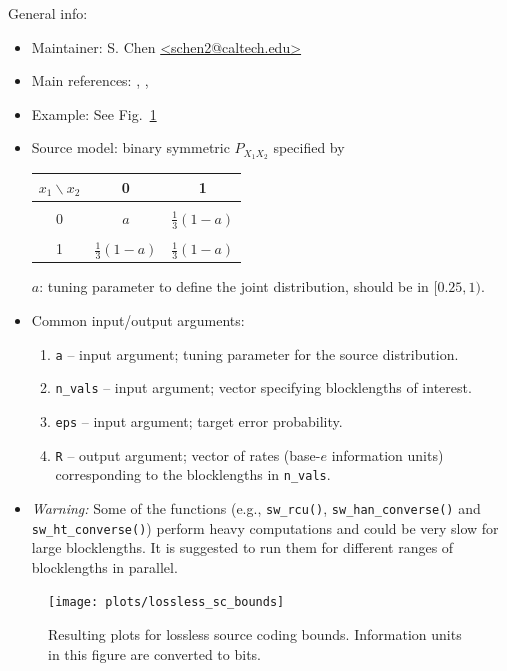 \documentclass[a4paper,11p]{memoir}
\begin{document}
General info:
\begin{itemize}
	\item Maintainer: S. Chen \url{<schen2@caltech.edu>}
	
	\item Main references: \cite{CEK19}, \cite{HAN03}, \cite{kostina2011fixed}
	
	\item Example: See Fig.~\ref{fig:lossless_sc_bounds} 
	
	\item Source model: binary symmetric $P_{X_1X_2}$ specified by
	\begin{center}
		\begin{tabular}[center]{ c | c  c }			
		$x_1 \backslash x_2$ & 0 & 1 \\
		\hline
		& & \\
		0 & $a$ & $\frac{1}{3}(1-a)$ \\ 
		& & \\
		1 & $\frac{1}{3}(1-a)$ & $\frac{1}{3}(1-a)$ \\
		\end{tabular}
	\end{center}
	$a$: tuning parameter to define the joint distribution, should be in $[0.25, 1)$.

	\item Common input/output arguments:
	\begin{enumerate}
		\item \verb|a| -- input argument; tuning parameter for the source distribution.
		\item \verb|n_vals| -- input argument; vector specifying blocklengths of interest.
		\item \verb|eps| -- input argument; target error probability.
		\item \verb|R| -- output argument; vector of rates (base-$e$ information units) corresponding to the blocklengths in \verb|n_vals|. 
	\end{enumerate}
	\item \textit{Warning:} Some of the functions (e.g., \verb|sw_rcu()|, \verb|sw_han_converse()| and \verb|sw_ht_converse()|) perform heavy computations and could be very slow for large blocklengths. It is suggested to run them for different ranges of blocklengths in parallel. 
\end{itemize}

\begin{figure}
\centering
\texttt{[image: plots/lossless\_sc\_bounds]}
\caption{Resulting plots for lossless source coding bounds. Information units in this figure are converted to bits.}\label{fig:lossless_sc_bounds}
\end{figure}
\end{document}
